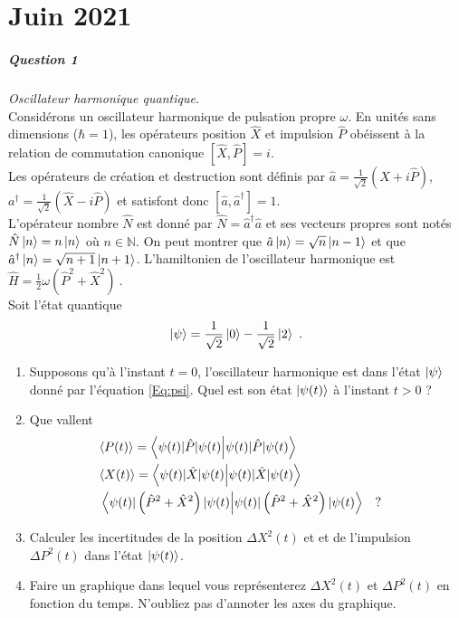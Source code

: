 \chapter{Juin 2021}

\paragraph{Question 1} \textit{Oscillateur harmonique quantique.} \\

Considérons un oscillateur harmonique de pulsation propre $\omega$. En unités sans dimensions ($\hbar=1$), les opérateurs position $\hat X$ et impulsion $\hat P$ obéissent à la relation de commutation canonique $[\hat X, \hat P]=i $. \\

Les opérateurs de création et destruction sont définis par 
$\hat a= \frac{1}{\sqrt{2}}(\hat X+i\hat P)$, $a^\dagger= \frac{1}{\sqrt{2}}(\hat X-i\hat P)$ et satisfont donc $[\hat a,\hat a^\dagger]=1$. \\

L'opérateur nombre $\hat N$ est donné par $\hat N= \hat a^\dagger \hat a$ et ses vecteurs propres sont notés $\hat N \ket{n} =n \ket{n}$ où $n \in \mathbb{N}$. On peut montrer que $\hat a \ket{n} =\sqrt{n} \ket{n-1}$ et que $\hat a^\dagger \ket{n} =\sqrt{n+1} \ket{n+1}$. L'hamiltonien de l'oscillateur harmonique est $\hat H = \frac{1}{2}\omega ( \hat P^2 + \hat X^2 )\ $. \\

Soit l'état quantique 
\begin{equation}
\vert \psi \rangle = 
 \frac{1}{\sqrt{2}}\ket{0}  - \frac{1}{\sqrt{2}}\ket{2} \ .
 \label{Eq:psi}
\end{equation}

\begin{enumerate}


\item 
Supposons qu'à l'instant $t=0$, l'oscillateur harmonique est dans l'état $\ket{\psi}$ donné par l'équation \eqref{Eq:psi}. Quel est son état $\ket{\psi(t)}$ à l'instant $t>0$ ?

\item 
Que vallent 
\begin{eqnarray}
&\langle P(t) \rangle = \braket{\psi (t)|\hat P|\psi(t)}&\\
&\langle X(t) \rangle = \braket{\psi(t)|\hat X|\psi(t)}&\\
&\braket{\psi(t)|\left( \hat P^2 + \hat X^2\right)|\psi(t)}\quad  ?&
\end{eqnarray}

\item 
Calculer les incertitudes de la position $\Delta X^2(t)$ et 
et de l'impulsion $\Delta P^2(t)$ dans l'état $\ket{\psi(t)}$.


\item Faire un graphique dans lequel vous représenterez  $\Delta X^2(t)$ et $\Delta P^2(t)$ en fonction du temps. N'oubliez pas d'annoter les axes du graphique.

\end{enumerate}

